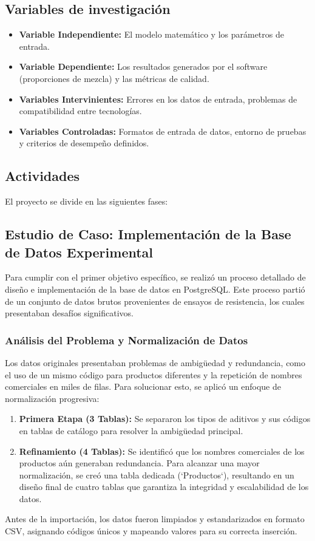 \documentclass[12pt, letterpaper]{article}
\begin{document}
\subsection{Variables de investigación}
\begin{itemize}
    \item \textbf{Variable Independiente:} El modelo matemático y los parámetros de entrada.
    \item \textbf{Variable Dependiente:} Los resultados generados por el software (proporciones de mezcla) y las métricas de calidad.
    \item \textbf{Variables Intervinientes:} Errores en los datos de entrada, problemas de compatibilidad entre tecnologías.
    \item \textbf{Variables Controladas:} Formatos de entrada de datos, entorno de pruebas y criterios de desempeño definidos.
\end{itemize}

\subsection{Actividades}
El proyecto se divide en las siguientes fases:

\subsection{Estudio de Caso: Implementación de la Base de Datos Experimental}
Para cumplir con el primer objetivo específico, se realizó un proceso detallado de diseño e implementación de la base de datos en PostgreSQL. Este proceso partió de un conjunto de datos brutos provenientes de ensayos de resistencia, los cuales presentaban desafíos significativos.

\subsubsection{Análisis del Problema y Normalización de Datos}
Los datos originales presentaban problemas de ambigüedad y redundancia, como el uso de un mismo código para productos diferentes y la repetición de nombres comerciales en miles de filas. Para solucionar esto, se aplicó un enfoque de normalización progresiva:
\begin{enumerate}
    \item \textbf{Primera Etapa (3 Tablas):} Se separaron los tipos de aditivos y sus códigos en tablas de catálogo para resolver la ambigüedad principal.
    \item \textbf{Refinamiento (4 Tablas):} Se identificó que los nombres comerciales de los productos aún generaban redundancia. Para alcanzar una mayor normalización, se creó una tabla dedicada (`Productos`), resultando en un diseño final de cuatro tablas que garantiza la integridad y escalabilidad de los datos.
\end{enumerate}
Antes de la importación, los datos fueron limpiados y estandarizados en formato CSV, asignando códigos únicos y mapeando valores para su correcta inserción.
\end{document}
